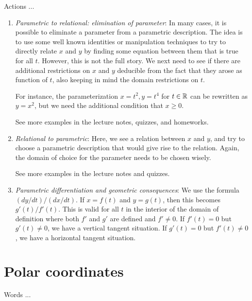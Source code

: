 \documentclass[10pt]{amsart}
\begin{document}
Actions ...

\begin{enumerate}
\item {\em Parametric to relational: elimination of parameter}: In
  many cases, it is possible to eliminate a parameter from a
  parametric description. The idea is to use some well known
  identities or manipulation techniques to try to directly relate $x$
  and $y$ by finding some equation between them that is true for all
  $t$. However, this is not the full story. We next need to see if
  there are additional restrictions on $x$ and $y$ deducible from the
  fact that they arose as function of $t$, also keeping in mind the
  domain restrictions on $t$.

  For instance, the parameterization $x = t^2, y = t^4$ for $t \in \mathbb{R}$
  can be rewritten as $y = x^2$, but we need the additional condition
  that $x \ge 0$.

  See more examples in the lecture notes, quizzes, and homeworks.
\item {\em Relational to parametric}: Here, we see a relation between
  $x$ and $y$, and try to choose a parametric description that would
  give rise to the relation. Again, the domain of choice for the
  parameter needs to be chosen wisely.

  See more examples in the lecture notes and quizzes.
\item {\em Parametric differentiation and geometric consequences}: We
  use the formula $(dy/dt)/(dx/dt)$. If $x = f(t)$ and $y = g(t)$,
  then this becomes $g'(t)/f'(t)$. This is valid for all $t$ in the
  interior of the domain of definition where both $f'$ and $g'$ are
  defined and $f' \ne 0$. If $f'(t) = 0$ but $g'(t) \ne 0$, we have a
  vertical tangent situation. If $g'(t) = 0$ but $f'(t) \ne 0$, we
  have a horizontal tangent situation.
\end{enumerate}

\section{Polar coordinates}

Words ...
\end{document}

